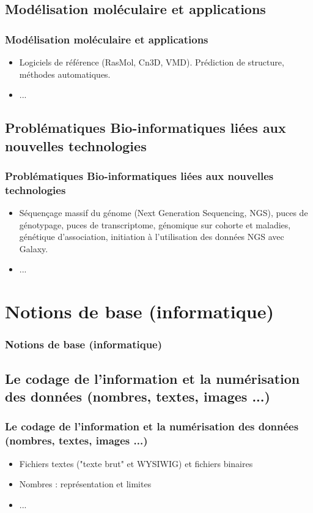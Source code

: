 \documentclass{beamer}
\begin{document}
\def\titleSection0Subsection4{Mod{\'e}lisation mol{\'e}culaire et applications}
\subsection{ \titleSection0Subsection4 }
\begin{frame}
	\frametitle{ \titleSection0Subsection4 }
	\begin{itemize}
		\item Logiciels de r{\'e}f{\'e}rence (RasMol, Cn3D, VMD). Pr{\'e}diction de structure, m{\'e}thodes automatiques.
		\item ... 
	\end{itemize}
\end{frame}

\def\titleSection0Subsection5{Probl{\'e}matiques Bio-informatiques li{\'e}es aux nouvelles technologies}
\subsection{ \titleSection0Subsection5 }
\begin{frame}
	\frametitle{ \titleSection0Subsection5 }
	\begin{itemize}
		\item S{\'e}quen\c{c}age massif du g{\'e}nome  (Next Generation Sequencing, NGS), puces de g{\'e}notypage, puces de transcriptome, g{\'e}nomique sur cohorte et maladies, g{\'e}n{\'e}tique d'association, initiation {\`a} l'utilisation des donn{\'e}es NGS avec Galaxy.
		\item ... 
	\end{itemize}
\end{frame}



\def\titleSection1{Notions de base (informatique)}
\section{ \titleSection1 }
\begin{frame}
	\frametitle{ \titleSection1 }
	\tableofcontents[sections=2,currentsection,subsectionstyle=show/shaded/hide]
\end{frame} 

\def\titleSection1SubsectionI{Le codage de l'information et la num{\'e}risation des donn{\'e}es (nombres, textes, images ...)}
\subsection{ \titleSection1SubsectionI }
\begin{frame}
	\frametitle{ \titleSection1SubsectionI }
	\begin{itemize}
		\item Fichiers textes ("texte brut" et WYSIWIG) et fichiers binaires
		\item Nombres : repr{\'e}sentation et limites
		\item ... 
	\end{itemize}
\end{frame}
\end{document}
